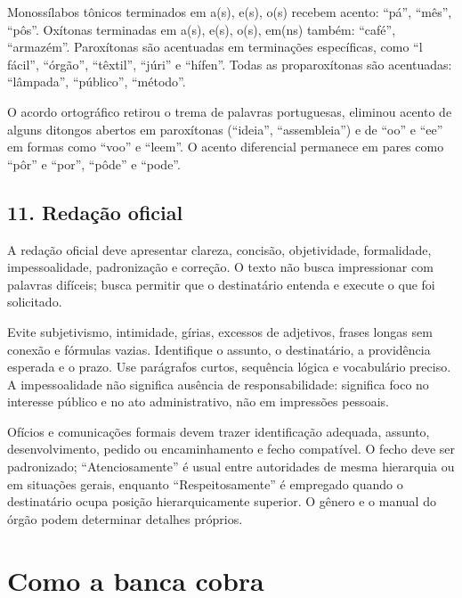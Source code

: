 \documentclass[11pt,a4paper]{article}
\begin{document}
Monossílabos tônicos terminados em a(s), e(s), o(s) recebem acento: “pá”, “mês”, “pôs”. Oxítonas terminadas em a(s), e(s), o(s), em(ns) também: “café”, “armazém”. Paroxítonas são acentuadas em terminações específicas, como “l fácil”, “órgão”, “têxtil”, “júri” e “hífen”. Todas as proparoxítonas são acentuadas: “lâmpada”, “público”, “método”.

O acordo ortográfico retirou o trema de palavras portuguesas, eliminou acento de alguns ditongos abertos em paroxítonas (“ideia”, “assembleia”) e de “oo” e “ee” em formas como “voo” e “leem”. O acento diferencial permanece em pares como “pôr” e “por”, “pôde” e “pode”.

\subsection*{11. Redação oficial}

A redação oficial deve apresentar clareza, concisão, objetividade, formalidade, impessoalidade, padronização e correção. O texto não busca impressionar com palavras difíceis; busca permitir que o destinatário entenda e execute o que foi solicitado.

Evite subjetivismo, intimidade, gírias, excessos de adjetivos, frases longas sem conexão e fórmulas vazias. Identifique o assunto, o destinatário, a providência esperada e o prazo. Use parágrafos curtos, sequência lógica e vocabulário preciso. A impessoalidade não significa ausência de responsabilidade: significa foco no interesse público e no ato administrativo, não em impressões pessoais.

Ofícios e comunicações formais devem trazer identificação adequada, assunto, desenvolvimento, pedido ou encaminhamento e fecho compatível. O fecho deve ser padronizado; “Atenciosamente” é usual entre autoridades de mesma hierarquia ou em situações gerais, enquanto “Respeitosamente” é empregado quando o destinatário ocupa posição hierarquicamente superior. O gênero e o manual do órgão podem determinar detalhes próprios.

\section*{Como a banca cobra}
\end{document}
